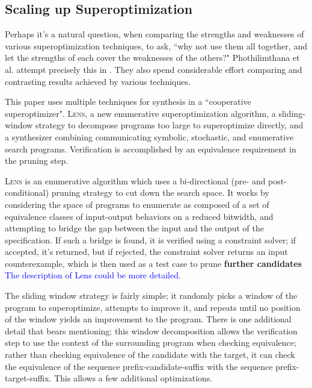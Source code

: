 \documentclass[12pt,twoside]{reedthesis}
\newcommand{\comment}[2]{\textbf{#1} \textcolor{blue}{#2}}
\begin{document}

    \subsection{Scaling up Superoptimization}
        Perhaps it's a natural question, when comparing the strengths and weaknesses of various superoptimization techniques, to ask, ``why not use them all together, and let the strengths of each cover the weaknesses of the others?"
        Phothilimthana et al. attempt precisely this in \cite{phothilimthana2016scaling}.
        They also spend considerable effort comparing and contrasting results achieved by various techniques.
        
        This paper uses multiple techniques for synthesis in a ``cooperative superoptimizer".
        \textsc{Lens}, a new enumerative superoptimization algorithm,
        a sliding-window strategy to decompose programs too large to superoptimize directly,
        and a synthesizer combining communicating symbolic, stochastic, and enumerative search programs.
        Verification is accomplished by an equivalence requirement in the pruning step.
        
        \textsc{Lens} is an enumerative algorithm which uses a bi-directional (pre- and post-conditional) pruning strategy to cut down the search space.
        It works by considering the space of programs to enumerate as composed of a set of equivalence classes of input-output behaviors on a reduced bitwidth, and attempting to bridge the gap between the input and the output of the specification.
        If such a bridge is found, it is verified using a constraint solver;
                if accepted, it's returned,
                but if rejected, the constraint solver returns an input counterexample,
            which is then used as a test case to prune \comment{further candidates}{The description of Lens could be more detailed}.
        
        The sliding window strategy is fairly simple; it randomly picks a window of the program to superoptimize, attempts to improve it, and repeats until no position of the window yields an improvement to the program.
        There is one additional detail that bears mentioning: 
            this window decomposition allows the verification step to use the context of the surrounding program when checking equivalence;
            rather than checking equivalence of the candidate with the target, it can check the equivalence of the sequence prefix-candidate-suffix with the sequence prefix-target-suffix.
        This allows a few additional optimizations.
        
\end{document}
